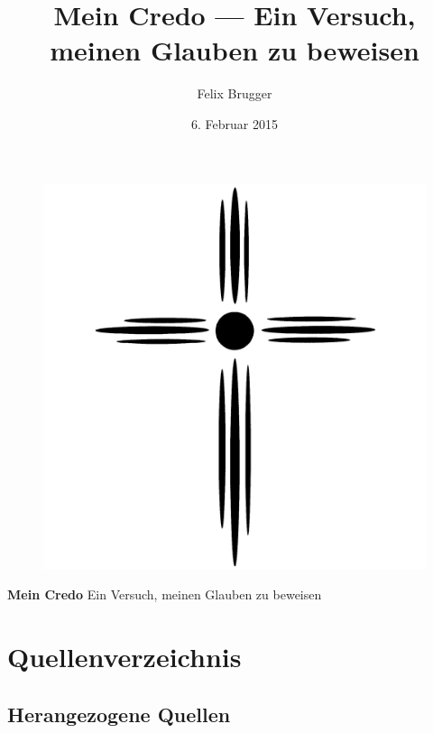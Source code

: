 \documentclass[12pt,a4paper]{scrreprt}
\author{Felix Brugger}
\title{Mein Credo --- Ein Versuch, meinen Glauben zu beweisen}
\date{6. Februar 2015}
\begin{document}
\pagestyle{empty}
\begin{figure}[h]
    \begin{center}
        \includegraphics[width=\linewidth]{Kreuz}
    \end{center}
\end{figure}

\bigskip
\bigskip
\bigskip

\begin{center}
    \Huge{\textbf{Mein Credo}}
    \linebreak
    \bigskip
    \large{Ein Versuch, meinen Glauben zu beweisen}
\end{center}

\newpage
\pagestyle{scrheadings}
\tableofcontents
\newpage

\part{Quellenverzeichnis}
\nocite{*}
\chapter{Herangezogene Quellen}
\printbibliography[heading=on, type=online]
\printbibliography[heading=lit, nottype=online, nottype=inproceedings]
\printbibliography[heading=vor, type=inproceedings]
\listoffigures
\end{document}
